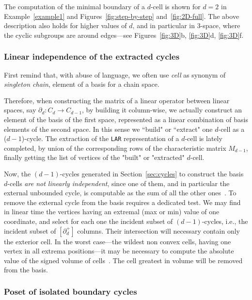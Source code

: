 The computation of the minimal boundary of a $d$-cell is shown for $d=2$ in Example~\ref{example1} and Figures~\ref{fig:step-by-step} and~\ref{fig:2D-full}. {The above description} also holds  for higher values of $d$, and in particular in 3-space, where the cyclic subgroups are around edges---see Figures~\ref{fig:3D}b, \ref{fig:3D}d, \ref{fig:3D}f. 


\subsubsection{Linear independence of the extracted {cycles}}
\label{sec:extrema}

First remind that, with abuse of language, we often use \emph{cell} as synonym of \emph{singleton chain}, {element of a basis for a chain space.}

{Therefore, when constructing the matrix of a linear operator between linear spaces, say $\partial_d: C_d\to C_{d-1}$, by building it column-wise, we actually construct an element of the basis of the first space, represented as a linear combination of basis elements of the second space. In this sense we ``build" or ``extract" one $d$-cell as a ($d-1$)-cycle. The extraction of the \texttt{LAR} representation of a $d$-cell is lately completed, by union of the  corresponding rows of the characteristic matrix $M_{d-1}$, finally getting the list of vertices of the "built" or "extracted" $d$-cell. }

{Now, the $(d-1)$-cycles  generated in Section~\ref{sec:cycles} to construct the basis $d$-cells}   \emph{are not linearly independent}, since one of them, and in particular the external unbounded cycle, is computable as the sum of all the other ones~\cite{mayeda:72}. To remove the external cycle from the basis requires a dedicated test. We may find in linear time the vertices having an extremal (max or min) value of one coordinate, and select for each one the incident subset of $(d-1)$-cycles, i.e., the incident subset of $[\partial_d^+]$ columns. Their intersection will necessary contain only the exterior cell. 
In the worst case---the wildest non convex cells, having one vertex in all extrema positions---it may be necessary to compute the absolute value of the signed volume of cells~\cite{Cattani:1990:BIO:87203.87215,Bernardini:1991:IPO:115604.115609}. The cell greatest in volume will be removed from the basis.

\subsubsection{Poset of isolated boundary cycles}

